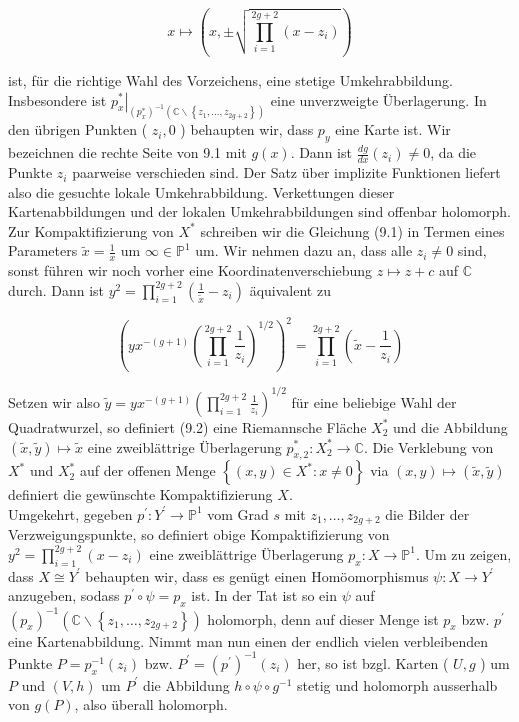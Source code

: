 \documentclass[10pt, letterpaper]{article}
\begin{document}
$$
x \longmapsto\left(x, \pm \sqrt{\prod_{i=1}^{2 g+2}\left(x-z_{i}\right)}\right)
$$

ist, für die richtige Wahl des Vorzeichens, eine stetige Umkehrabbildung. Insbesondere ist $\left.p_{x}^{*}\right|_{\left(p_{x}^{*}\right)^{-1}\left(\mathbb{C} \backslash\left\{z_{1}, \ldots, z_{2 g+2}\right\}\right)}$ eine unverzweigte Überlagerung. In den übrigen Punkten ( $z_{i}, 0$ ) behaupten wir, dass $p_{y}$ eine Karte ist. Wir bezeichnen die rechte Seite von 9.1 mit $g(x)$. Dann ist $\frac{d g}{d x}\left(z_{i}\right) \neq 0$, da die Punkte $z_{i}$ paarweise verschieden sind. Der Satz über implizite Funktionen liefert also die gesuchte lokale Umkehrabbildung. Verkettungen dieser Kartenabbildungen und der lokalen Umkehrabbildungen sind offenbar holomorph.\\
Zur Kompaktifizierung von $X^{*}$ schreiben wir die Gleichung (9.1) in Termen eines Parameters $\widetilde{x}=\frac{1}{x}$ um $\infty \in \mathbb{P}^{1}$ um. Wir nehmen dazu an, dass alle $z_{i} \neq 0$ sind, sonst führen wir noch vorher eine Koordinatenverschiebung $z \longmapsto z+c$ auf $\mathbb{C}$ durch. Dann ist $y^{2}=\prod_{i=1}^{2 g+2}\left(\frac{1}{\widetilde{x}}-z_{i}\right)$ äquivalent zu

$$
\left(y x^{-(g+1)}\left(\prod_{i=1}^{2 g+2} \frac{1}{z_{i}}\right)^{1 / 2}\right)^{2}=\prod_{i=1}^{2 g+2}\left(\widetilde{x}-\frac{1}{z_{i}}\right)
$$

Setzen wir also $\widetilde{y}=y x^{-(g+1)}\left(\prod_{i=1}^{2 g+2} \frac{1}{z_{i}}\right)^{1 / 2}$ für eine beliebige Wahl der Quadratwurzel, so definiert (9.2) eine Riemannsche Fläche $X_{2}^{*}$ und die Abbildung $(\widetilde{x}, \widetilde{y}) \longmapsto \widetilde{x}$ eine zweiblättrige Überlagerung $p_{x, 2}^{*}: X_{2}^{*} \longrightarrow \mathbb{C}$. Die Verklebung von $X^{*}$ und $X_{2}^{*}$ auf der offenen Menge $\left\{(x, y) \in X^{*}: x \neq 0\right\}$ via $(x, y) \longmapsto(\widetilde{x}, \widetilde{y})$ definiert die gewünschte Kompaktifizierung $X$.\\
Umgekehrt, gegeben $p^{\prime}: Y^{\prime} \longrightarrow \mathbb{P}^{1}$ vom Grad $s$ mit $z_{1}, \ldots, z_{2 g+2}$ die Bilder der Verzweigungspunkte, so definiert obige Kompaktifizierung von $y^{2}= \prod_{i=1}^{2 g+2}\left(x-z_{i}\right)$ eine zweiblättrige Überlagerung $p_{x}: X \longrightarrow \mathbb{P}^{1}$. Um zu zeigen, dass $X \cong Y^{\prime}$ behaupten wir, dass es genügt einen Homöomorphismus $\psi: X \longrightarrow Y^{\prime}$ anzugeben, sodass $p^{\prime} \circ \psi=p_{x}$ ist. In der Tat ist so ein $\psi$ auf $\left(p_{x}\right)^{-1}\left(\mathbb{C} \backslash\left\{z_{1}, \ldots, z_{2 g+2}\right\}\right)$ holomorph, denn auf dieser Menge ist $p_{x}$ bzw. $p^{\prime}$ eine Kartenabbildung. Nimmt man nun einen der endlich vielen verbleibenden Punkte $P=p_{x}^{-1}\left(z_{i}\right)$ bzw. $P^{\prime}=\left(p^{\prime}\right)^{-1}\left(z_{i}\right)$ her, so ist bzgl. Karten ( $U, g$ ) um $P$ und $(V, h)$ um $P^{\prime}$ die Abbildung $h \circ \psi \circ g^{-1}$ stetig und holomorph ausserhalb von $g(P)$, also überall holomorph.
\end{document}
